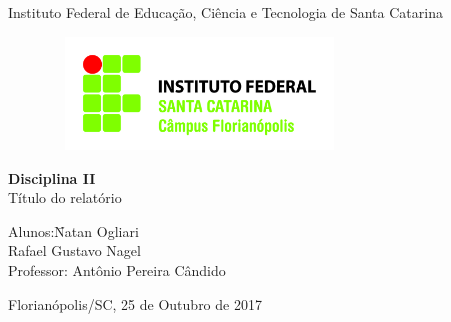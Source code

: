 \documentclass[a4paper, 12pt]{article}
\begin{document}

\begin{titlepage}
	\begin{center} %
		\huge{Instituto Federal de Educação, Ciência e Tecnologia de Santa Catarina}

\vspace{10pt} 
\begin{figure}[!ht]
\centering
\includegraphics[height=3cm, width=8cm]{LOGO.jpg}
\end{figure}
        
        \vspace{85pt}
        
		\textbf{\LARGE{Disciplina II}}\\  	%
		\large{Título do relatório} 		%
		\vspace{160pt}
		
	\end{center}
	
	\begin{flushleft}
		\begin{tabbing}
			Alunos:\qquad\qquad\= Natan Ogliari\\   %
			\>Rafael Gustavo Nagel\\  %
            
			Professor:\> Antônio Pereira Cândido \\
		
	\end{tabbing}
		  
	\end{flushleft}
	
	\begin{center}
		\vspace{\fill}
		Florianópolis/SC, 25 de Outubro de 2017
	\end{center}
\end{titlepage}
\newpage
\tableofcontents
\thispagestyle{empty}
\end{document}
